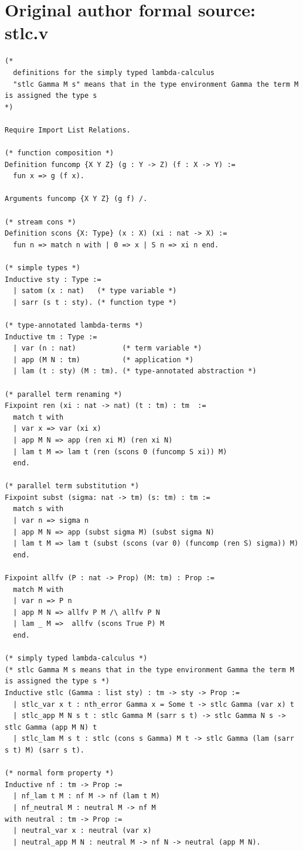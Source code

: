 \documentclass[10pt,a4paper]{article}
\begin{document}
\section*{Original author formal source: stlc.v}
\begin{lstlisting}[style=authorcoq]
(*
  definitions for the simply typed lambda-calculus
  "stlc Gamma M s" means that in the type environment Gamma the term M is assigned the type s
*)

Require Import List Relations.

(* function composition *)
Definition funcomp {X Y Z} (g : Y -> Z) (f : X -> Y) :=
  fun x => g (f x).

Arguments funcomp {X Y Z} (g f) /.

(* stream cons *)
Definition scons {X: Type} (x : X) (xi : nat -> X) :=
  fun n => match n with | 0 => x | S n => xi n end.

(* simple types *)
Inductive sty : Type :=
  | satom (x : nat)   (* type variable *)
  | sarr (s t : sty). (* function type *)

(* type-annotated lambda-terms *)
Inductive tm : Type :=
  | var (n : nat)           (* term variable *)
  | app (M N : tm)          (* application *)
  | lam (t : sty) (M : tm). (* type-annotated abstraction *)

(* parallel term renaming *)
Fixpoint ren (xi : nat -> nat) (t : tm) : tm  :=
  match t with
  | var x => var (xi x)
  | app M N => app (ren xi M) (ren xi N)
  | lam t M => lam t (ren (scons 0 (funcomp S xi)) M)
  end.

(* parallel term substitution *)
Fixpoint subst (sigma: nat -> tm) (s: tm) : tm :=
  match s with
  | var n => sigma n
  | app M N => app (subst sigma M) (subst sigma N)
  | lam t M => lam t (subst (scons (var 0) (funcomp (ren S) sigma)) M)
  end.

Fixpoint allfv (P : nat -> Prop) (M: tm) : Prop :=
  match M with
  | var n => P n
  | app M N => allfv P M /\ allfv P N
  | lam _ M =>  allfv (scons True P) M
  end.

(* simply typed lambda-calculus *)
(* stlc Gamma M s means that in the type environment Gamma the term M is assigned the type s *)
Inductive stlc (Gamma : list sty) : tm -> sty -> Prop :=
  | stlc_var x t : nth_error Gamma x = Some t -> stlc Gamma (var x) t
  | stlc_app M N s t : stlc Gamma M (sarr s t) -> stlc Gamma N s -> stlc Gamma (app M N) t
  | stlc_lam M s t : stlc (cons s Gamma) M t -> stlc Gamma (lam (sarr s t) M) (sarr s t).

(* normal form property *)
Inductive nf : tm -> Prop :=
  | nf_lam t M : nf M -> nf (lam t M)
  | nf_neutral M : neutral M -> nf M
with neutral : tm -> Prop :=
  | neutral_var x : neutral (var x)
  | neutral_app M N : neutral M -> nf N -> neutral (app M N).


\end{lstlisting}
\end{document}
